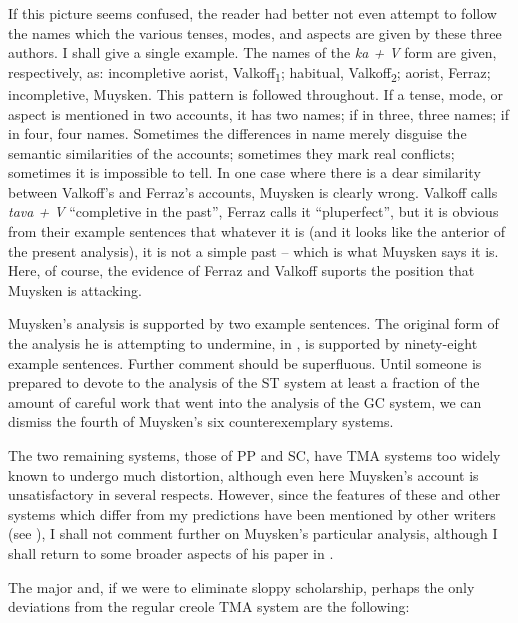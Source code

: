 If this picture seems confused, the reader had better not even attempt to follow the names which the various tenses, modes, and aspects are given by these three authors. I shall give a single example. The names of the \textit{ka + V} form are given, respectively, as: incompletive aorist, Valkoff\textsubscript{1}; habitual, Valkoff\textsubscript{2}; aorist, Ferraz; incompletive, Muysken. This pattern is followed throughout. If a tense, mode, or aspect is mentioned in two accounts, it has two names; if in three, three names; if in four, four names. Sometimes the differences in name merely disguise the semantic similarities of the accounts; sometimes they mark real conflicts; sometimes it is impossible to tell. In one case where there is a dear similarity between Valkoff's and Ferraz's accounts, Muysken is clearly wrong. Valkoff calls \textit{tava + V} ``completive
in the past'', Ferraz calls it ``pluperfect'', but it is obvious from their example sentences that whatever it is (and it looks like the anterior of the present analysis), it is not a simple past -- which is what Muysken says it is. Here, of course, the evidence of Ferraz and Valkoff suports the position that Muysken is attacking.

Muysken's analysis is supported by two example sentences. The original form of the analysis he is attempting to undermine, in \citet[Chapter~2]{Bickerton1975}, is supported by ninety-eight example sentences. Further comment should be superfluous. Until someone is prepared to devote to the analysis of the ST system at least a fraction of the amount of careful work that went into the analysis of the GC system, we can dismiss the fourth of Muysken's six counterexemplary systems.

The two remaining systems, those of PP and SC, have TMA sys\-tems too widely known to undergo much distortion, although even here Muysken's account is unsatisfactory in several respects. However, since the features of these and other systems which differ from my predictions have been mentioned by other writers (see \citealt{Hill1979}), I shall not comment further on Muysken's particular analysis, although I shall return to some broader aspects of his paper in .

The major and, if we were to eliminate sloppy scholarship, perhaps the only deviations from the regular creole TMA system are the following:


